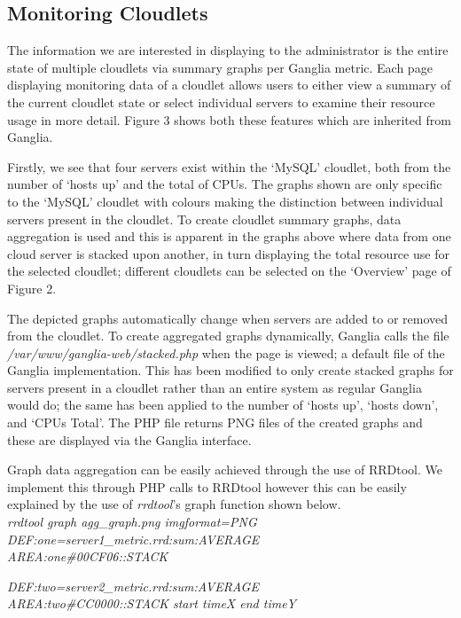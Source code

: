 \documentclass[10pt, conference, compsocconf]{IEEEtran}
\begin{document}
\subsection{Monitoring Cloudlets}
The information we are interested in displaying to the administrator is the entire state of multiple cloudlets via summary graphs per Ganglia metric. Each page displaying monitoring data of a cloudlet allows users to either view a summary of the current cloudlet state or select individual servers to examine their resource usage in more detail. Figure 3 shows both these features which are inherited from Ganglia.

Firstly, we see that four servers exist within the `MySQL' cloudlet, both from the number of `hosts up' and the total of CPUs. The graphs shown are only specific to the `MySQL' cloudlet with colours making the distinction between individual servers present in the cloudlet. To create cloudlet summary graphs, data aggregation is used and this is apparent in the graphs above where data from one cloud server is stacked upon another, in turn displaying the total resource use for the selected cloudlet; different cloudlets can be selected on the `Overview' page of Figure 2. 

The depicted graphs automatically change when servers are added to or removed from the cloudlet. To create aggregated graphs dynamically, Ganglia calls the file \textit{/var/www/ganglia-web/stacked.php} when the page is viewed; a default file of the Ganglia implementation. This has been modified to only create stacked graphs for servers present in a cloudlet rather than an entire system as regular Ganglia would do; the same has been applied to the number of `hosts up', `hosts down', and `CPUs Total'. The PHP file returns PNG files of the created graphs and these are displayed via the Ganglia interface.

Graph data aggregation can be easily achieved through the use of RRDtool. We implement this through PHP calls to RRDtool however this can be easily explained by the use of \textit{rrdtool}'s graph function shown below.\\

\noindent\textit{rrdtool graph agg\_graph.png \textendash \textendash imgformat=PNG}\\
\textit{DEF:one=server1\_metric.rrd:sum:AVERAGE}\\
\textit{AREA:one\#00CF06::STACK}

\noindent\textit{DEF:two=server2\_metric.rrd:sum:AVERAGE}\\
\textit{AREA:two\#CC0000::STACK \textendash \textendash start timeX \textendash \textendash end timeY}\\
\end{document}
